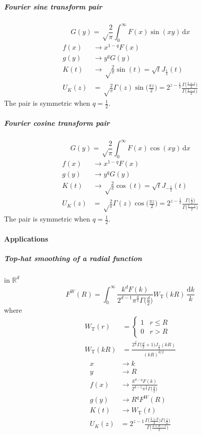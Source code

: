 \documentclass{article}
\renewcommand{\d}{\mathrm{d}}
\newcommand{\Tophat}{\textrm{T}}
\begin{document}
\subparagraph{Fourier sine transform pair}
\begin{equation}
    G(y) = \sqrt\frac2\pi \int_0^\infty F(x) \sin(xy) \,\d x
\end{equation}
\begin{align}
    f(x) &\to x^{1-q} F(x)  \\
    g(y) &\to y^q G(y)  \\
    K(t) &\to \sqrt\frac2\pi \sin(t) = \sqrt t J_\frac12(t)  \\
    U_K(z) &= \sqrt\frac2\pi \Gamma(z) \sin\bigl(\frac{\pi z}2\bigr)
    = 2^{z-\frac12} \frac{\Gamma\bigl(\frac{1+z}2\bigr)}{\Gamma\bigl(\frac{2-z}2\bigr)}
\end{align}
The pair is symmetric when $q=\frac12$.


\subparagraph{Fourier cosine transform pair}
\begin{equation}
    G(y) = \sqrt\frac2\pi \int_0^\infty F(x) \cos(xy) \,\d x
\end{equation}
\begin{align}
    f(x) &\to x^{1-q} F(x)  \\
    g(y) &\to y^q G(y)  \\
    K(t) &\to \sqrt\frac2\pi \cos(t) = \sqrt t J_{-\frac12}(t)  \\
    U_K(z) &= \sqrt\frac2\pi \Gamma(z) \cos\bigl(\frac{\pi z}2\bigr)
    = 2^{z-\frac12} \frac{\Gamma\bigl(\frac{z}2\bigr)}{\Gamma\bigl(\frac{1-z}2\bigr)}
\end{align}
The pair is symmetric when $q=\frac12$.


\paragraph{Applications}


\subparagraph{Top-hat smoothing of a radial function}
in $\mathbb{R}^d$
\begin{equation}
    F^W(R) = \int_0^\infty \frac{k^dF(k)}{2^{d-1}\pi^\frac{d}2\Gamma\bigl(\frac{d}2\bigr)}
                    W_\Tophat(kR) \,\frac{\d k}k
\end{equation}
where
\begin{align}
    W_\Tophat(r) &= \begin{cases}
        1 & r\leq R \\
        0 & r > R
    \end{cases} \\
    W_\Tophat(kR) &= \frac{2^\frac{d}2\Gamma\bigl(\frac{d}2+1\bigr)J_\frac{d}2(kR)}{(kR)^{d/2}}
\end{align}
\begin{align}
    x &\to k  \\
    y &\to R  \\
    f(x) &\to \frac{k^{d-q}F(k)}{2^{d-1}\pi^\frac{d}2\Gamma\bigl(\frac{d}2\bigr)}  \\
    g(y) &\to R^q F^W(R)  \\
    K(t) &\to W_\Tophat(t)  \\
    U_K(z) &= 2^{z-1} \frac{\Gamma\bigl(\frac{2+d}2\bigr)\Gamma\bigl(\frac{z}2\bigr)}
                        {\Gamma\bigl(\frac{2+d-z}2\bigr)}
\end{align}
\end{document}
